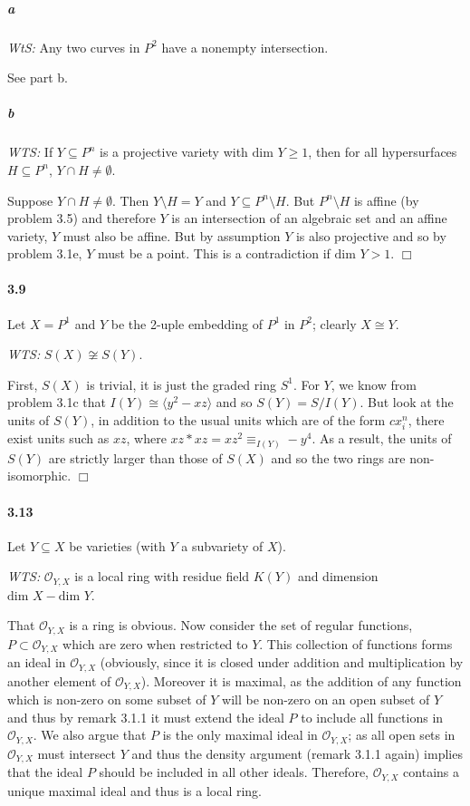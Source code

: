 \documentclass{article}
\begin{document}
\subparagraph{a} 
\emph{WtS:} Any two curves in $P^2$ have a nonempty intersection.

See part b.

\subparagraph{b}
\emph{WTS:} If $Y \subseteq P^n$ is a projective variety with $\textrm{dim } Y \geq 1$, then for all hypersurfaces $H \subseteq P^n$, $Y \cap H \neq \emptyset$.

Suppose $Y \cap H \neq \emptyset$.  Then $Y \setminus H = Y$ and $Y \subseteq P^n \setminus H$.  But $P^n \setminus H$ is affine (by problem 3.5) and therefore $Y$ is an intersection of an algebraic set and an affine variety, $Y$ must also be affine.  But by assumption $Y$ is also projective and so by problem 3.1e, $Y$ must be a point.  This is a contradiction if $\textrm{dim } Y > 1$. $\Box$

\paragraph{3.9}

Let $X = P^1$ and $Y$ be the 2-uple embedding of $P^1$ in $P^2$; clearly $X \cong Y$.

\emph{WTS:} $S(X) \not \cong S(Y)$.

First, $S(X)$ is trivial, it is just the graded ring $S^1$.  For $Y$, we know from problem 3.1c that $I(Y) \cong \langle y^2 - xz \rangle$ and so $S(Y) = S / I(Y)$.  But look at the units of $S(Y)$, in addition to the usual units which are of the form $c x_i^n$, there exist units such as $xz$, where $xz * xz = xz^2 \equiv_{I(Y)} -y^4$.  As a result, the units of $S(Y)$ are strictly larger than those of $S(X)$ and so the two rings are non-isomorphic. $\Box$

\paragraph{3.13}

Let $Y \subseteq X$ be varieties (with $Y$ a subvariety of $X$).

\emph{WTS:} $\mathcal{O}_{Y,X}$ is a local ring with residue field $K(Y)$ and dimension $\textrm{dim }X - \textrm{dim }Y$.

That $\mathcal{O}_{Y,X}$ is a ring is obvious.  Now consider the set of regular functions, $P \subset \mathcal{O}_{Y,X}$ which are zero when restricted to $Y$.  This collection of functions forms an ideal in $\mathcal{O}_{Y,X}$ (obviously, since it is closed under addition and multiplication by another element of $\mathcal{O}_{Y,X}$).  Moreover it is maximal, as the addition of any function which is non-zero on some subset of $Y$ will be non-zero on an open subset of $Y$ and thus by remark 3.1.1 it must extend the ideal $P$ to include all functions in $\mathcal{O}_{Y,X}$.  We also argue that $P$ is the only maximal ideal in $\mathcal{O}_{Y,X}$; as all open sets in $\mathcal{O}_{Y,X}$ must intersect $Y$ and thus the density argument (remark 3.1.1 again) implies that the ideal $P$ should be included in all other ideals.  Therefore, $\mathcal{O}_{Y,X}$ contains a unique maximal ideal and thus is a local ring.
\end{document}
